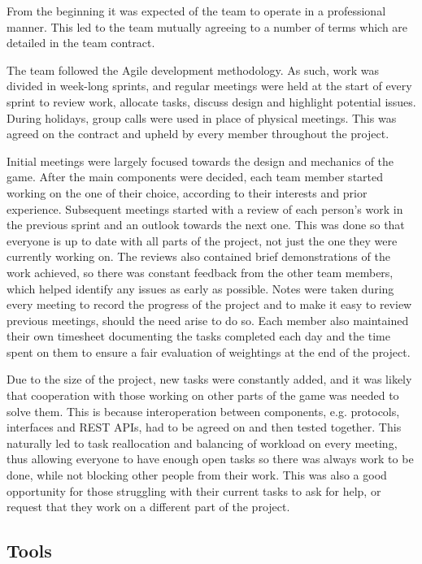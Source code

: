 \documentclass[a4paper,11pt]{article}
\begin{document}
From the beginning it was expected of the team to operate in a professional manner. This led to the team mutually agreeing to a number of terms which are detailed in the team contract.

The team followed the Agile development methodology. As such, work was divided in week-long sprints, and regular meetings were held at the start of every sprint to review work, allocate tasks, discuss design and highlight potential issues. During holidays, group calls were used in place of physical meetings. This was agreed on the contract and upheld by every member throughout the project.

Initial meetings were largely focused towards the design and mechanics of the game. After the main components were decided, each team member started working on the one of their choice, according to their interests and prior experience. Subsequent meetings started with a review of each person’s work in the previous sprint and an outlook towards the next one. This was done so that everyone is up to date with all parts of the project, not just the one they were currently working on. The reviews also contained brief demonstrations of the work achieved, so there was constant feedback from the other team members, which helped identify any issues as early as possible. Notes were taken during every meeting to record the progress of the project and to make it easy to review previous meetings, should the need arise to do so. Each member also maintained their own timesheet documenting the tasks completed each day and the time spent on them to ensure a fair evaluation of weightings at the end of the project.

Due to the size of the project, new tasks were constantly  added, and it was likely that cooperation with those working on other parts of the game was needed to solve them. This is because interoperation between components, e.g. protocols, interfaces and REST APIs, had to be agreed on and then tested together. This naturally led to task reallocation and balancing of workload on every meeting, thus allowing everyone to have enough open tasks so there was always work to be done, while not blocking other people from their work. This was also a good opportunity for those struggling with their current tasks to ask for help, or request that they work on a different part of the project.

\subsection{Tools}
\end{document}
